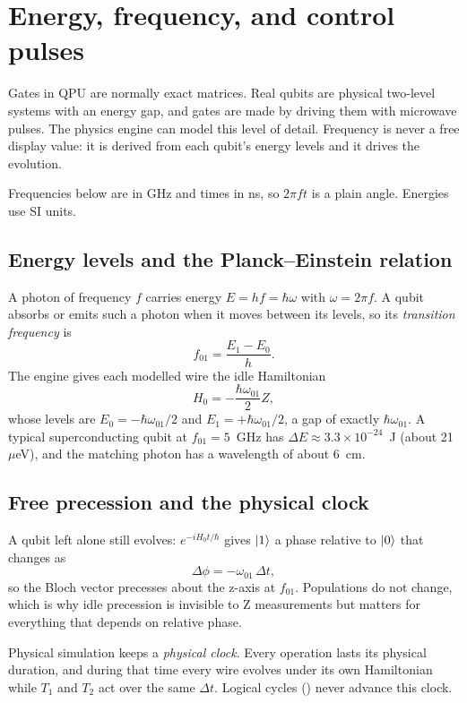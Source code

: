 \section{Energy, frequency, and control pulses}
\hypertarget{frequency-and-pulses}{}

Gates in QPU are normally exact matrices. Real qubits are physical two-level
systems with an energy gap, and gates are made by driving them with
microwave pulses. The physics engine can model this level of detail. Frequency
is never a free display value: it is derived from each qubit's energy levels
and it drives the evolution.

Frequencies below are in GHz and times in ns, so $2\pi f t$ is a plain
angle. Energies use SI units.

\subsection{Energy levels and the Planck--Einstein relation}

A photon of frequency $f$ carries energy $E=hf=\hbar\omega$ with
$\omega=2\pi f$. A qubit absorbs or emits such a photon when it moves between
its levels, so its \emph{transition frequency} is
\[
f_{01}=\frac{E_1-E_0}{h}.
\]
The engine gives each modelled wire the idle Hamiltonian
\[
H_0=-\frac{\hbar\omega_{01}}{2}Z,
\]
whose levels are $E_0=-\hbar\omega_{01}/2$ and $E_1=+\hbar\omega_{01}/2$, a gap
of exactly $\hbar\omega_{01}$. A typical superconducting qubit at
$f_{01}=5$~GHz has $\Delta E\approx3.3\times10^{-24}$~J (about 21~$\mu$eV), and
the matching photon has a wavelength of about 6~cm.

\subsection{Free precession and the physical clock}

A qubit left alone still evolves: $e^{-iH_0t/\hbar}$ gives $\lvert 1\rangle$ a phase
relative to $\lvert 0\rangle$ that changes as
\[
\Delta\phi=-\omega_{01}\,\Delta t,
\]
so the Bloch vector precesses about the z-axis at $f_{01}$. Populations do not
change, which is why idle precession is invisible to Z measurements but
matters for everything that depends on relative phase.

Physical simulation keeps a \emph{physical clock}. Every operation lasts its
physical duration, and during that time every wire evolves under its own
Hamiltonian while $T_1$ and $T_2$ act over the same $\Delta t$. Logical cycles
() never advance this clock.

